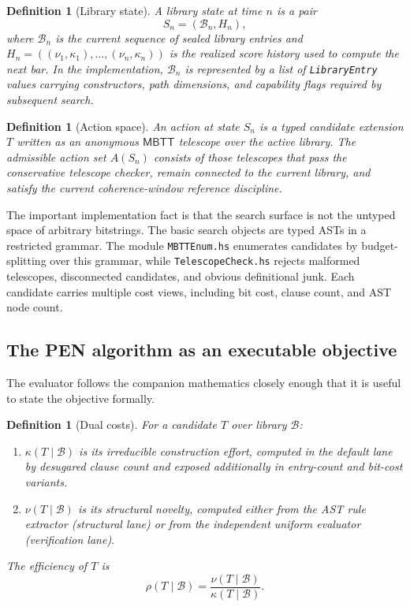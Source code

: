 \documentclass[pdflatex,sn-mathphys,Numbered]{sn-jnl}
\theoremstyle{thmstyleone}
\theoremstyle{thmstylethree}
\newtheorem{definition}[theorem]{Definition}
\theoremstyle{thmstyletwo}
\newcommand{\Bcal}{\mathcal{B}}
\newcommand{\MBTT}{\ensuremath{\mathsf{MBTT}}}
\begin{document}
\begin{definition}[Library state]
A library state at time $n$ is a pair
\[
  S_n=(\Bcal_n,H_n),
\]
where $\Bcal_n$ is the current sequence of sealed library entries and $H_n=((\nu_1,\kappa_1),\dots,(\nu_n,\kappa_n))$ is the realized score history used to compute the next bar. In the implementation, $\Bcal_n$ is represented by a list of \texttt{LibraryEntry} values carrying constructors, path dimensions, and capability flags required by subsequent search.
\end{definition}

\begin{definition}[Action space]
An action at state $S_n$ is a typed candidate extension $T$ written as an anonymous \MBTT{} telescope over the active library. The admissible action set $A(S_n)$ consists of those telescopes that pass the conservative telescope checker, remain connected to the current library, and satisfy the current coherence-window reference discipline.
\end{definition}

The important implementation fact is that the search surface is not the untyped space of arbitrary bitstrings. The basic search objects are typed ASTs in a restricted grammar. The module \texttt{MBTTEnum.hs} enumerates candidates by budget-splitting over this grammar, while \texttt{TelescopeCheck.hs} rejects malformed telescopes, disconnected candidates, and obvious definitional junk. Each candidate carries multiple cost views, including bit cost, clause count, and AST node count.

\subsection{The PEN algorithm as an executable objective}

The evaluator follows the companion mathematics closely enough that it is useful to state the objective formally.

\begin{definition}[Dual costs]
For a candidate $T$ over library $\Bcal$:
\begin{enumerate}[label=(\roman*),nosep]
\item $\kappa(T\mid\Bcal)$ is its irreducible construction effort, computed in the default lane by desugared clause count and exposed additionally in entry-count and bit-cost variants.
\item $\nu(T\mid\Bcal)$ is its structural novelty, computed either from the AST rule extractor (structural lane) or from the independent uniform evaluator (verification lane).
\end{enumerate}
The efficiency of $T$ is
\[
  \rho(T\mid\Bcal)=\frac{\nu(T\mid\Bcal)}{\kappa(T\mid\Bcal)}.
\]
\end{definition}
\end{document}
